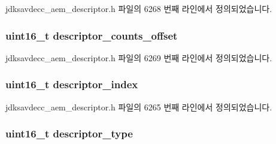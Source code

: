 jdksavdecc\+\_\+aem\+\_\+descriptor.\+h 파일의 6268 번째 라인에서 정의되었습니다.

\subsubsection[{\texorpdfstring{descriptor\+\_\+counts\+\_\+offset}{descriptor_counts_offset}}]{\setlength{\rightskip}{0pt plus 5cm}uint16\+\_\+t descriptor\+\_\+counts\+\_\+offset}\hypertarget{structjdksavdecc__descriptor__configuration_ae57b83bb9db0fb81735dba7d02bac8bb}{}\label{structjdksavdecc__descriptor__configuration_ae57b83bb9db0fb81735dba7d02bac8bb}


jdksavdecc\+\_\+aem\+\_\+descriptor.\+h 파일의 6269 번째 라인에서 정의되었습니다.

\subsubsection[{\texorpdfstring{descriptor\+\_\+index}{descriptor_index}}]{\setlength{\rightskip}{0pt plus 5cm}uint16\+\_\+t descriptor\+\_\+index}\hypertarget{structjdksavdecc__descriptor__configuration_a042bbc76d835b82d27c1932431ee38d4}{}\label{structjdksavdecc__descriptor__configuration_a042bbc76d835b82d27c1932431ee38d4}


jdksavdecc\+\_\+aem\+\_\+descriptor.\+h 파일의 6265 번째 라인에서 정의되었습니다.

\subsubsection[{\texorpdfstring{descriptor\+\_\+type}{descriptor_type}}]{\setlength{\rightskip}{0pt plus 5cm}uint16\+\_\+t descriptor\+\_\+type}\hypertarget{structjdksavdecc__descriptor__configuration_ab7c32b6c7131c13d4ea3b7ee2f09b78d}{}\label{structjdksavdecc__descriptor__configuration_ab7c32b6c7131c13d4ea3b7ee2f09b78d}


